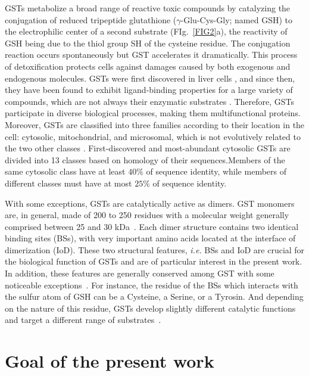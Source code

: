 GSTs metabolize a broad range of reactive toxic compounds by catalyzing the conjugation of reduced tripeptide glutathione ($\gamma$-Glu-Cys-Gly; named GSH) to the electrophilic center of a second substrate \cite{mannervik1985isoenzymes, armstrong1997structure, hayes2005glutathione} (FIg.~\ref{FIG2}a), the reactivity of GSH being due to the thiol group SH of the cysteine residue. The conjugation reaction occurs spontaneously but GST accelerates it dramatically. This process of detoxification protects cells against damages caused by both exogenous and endogenous molecules. GSTs were first discovered in liver cells \cite{combes1961liver}, and since then, they have been found to exhibit ligand-binding properties for a large variety of compounds, which are not always their enzymatic substrates \cite{axarli2004characterization}. Therefore, GSTs participate in diverse biological processes, making them multifunctional proteins. Moreover, GSTs are classified into three families according to their location in the cell: cytosolic, mitochondrial, and microsomal, which is not evolutively related to the two other classes \cite{oakley2011glutathione}. First-discovered and most-abundant cytosolic GSTs are divided into 13 classes based on homology of their sequences.Members of the same cytosolic class have at least $40\%$ of sequence identity, while members of different classes must have at most $25\%$ of sequence identity. 

With some exceptions, GSTs are catalytically active as dimers. GST monomers are, in general, made of 200 to 250 residues with a molecular weight generally comprised between 25 and 30 kDa~\cite{frova_glutathione_2006,board_glutathione_2013}. Each dimer structure contains two identical binding sites (BSs), with very important amino acids located at the interface of dimerization (IoD). These two structural features, \textit{i.e.} BSs and IoD are crucial for the biological function of GSTs and are of particular interest in the present work. In addition, these features are generally conserved among GST with some noticeable exceptions~\cite{board_glutathione_2013}. For instance, the residue of the BSs which interacts with the sulfur atom of GSH can be a Cysteine, a Serine, or a Tyrosin. And depending on the nature of this residue, GSTs develop slightly different catalytic functions and target a different range of substrates~\cite{mannervik_glutathione_1988,cummins_multiple_2011,deponte_glutathione_2013}. 

\section{Goal of the present work}

